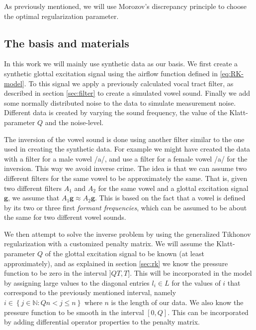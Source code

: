 \documentclass[12pt,a4]{article}
\newcommand{\N}{{\mathbb N}}
\newcommand{\vc}[1]{\ensuremath{\bm{#1}}}
\begin{document}
As previously mentioned, we will use Morozov's discrepancy principle to choose the optimal regularization parameter.

\subsection{The basis and materials}
\label{sec:basis}

In this work we will mainly use synthetic data as our basis. We first create a synthetic glottal excitation signal using the airflow function defined in \eqref{eq:RK-model}. To this signal we apply a previously calculated vocal tract filter, as described in section \ref{sec:filter} to create a simulated vowel sound. Finally we add some normally distributed noise to the data to simulate measurement noise. Different data is created by varying the sound frequency, the value of the Klatt-parameter $Q$ and the noise-level.

The inversion of the vowel sound is done using another filter similar to the one used in creating the synthetic data. For example we might have created the data with a filter for a male vowel /a/, and use a filter for a female vowel /a/ for the inversion. This way we avoid inverse crime. The idea is that we can assume two different filters for the same vowel to be approximately the same. That is, given two different filters $A_1$ and $A_2$ for the same vowel and a glottal excitation signal $\vc{g}$, we assume that $A_1 \vc{g} \approx A_2 \vc{g}$. This is based on the fact that a vowel is defined by its two or three first \emph{formant frequencies}, which can be assumed to be about the same for two different vowel sounds.\cite{digitalmodels}

We then attempt to solve the inverse problem by using the generalized Tikhonov regularization with a customized penalty matrix. We will assume the Klatt-parameter $Q$ of the glottal excitation signal to be known (at least approximately), and as explained in section \ref{sec:rk} we know the pressure function to be zero in the interval $]QT, T]$. This will be incorporated in the model by assigning large values to the diagonal entries $l_i \in L$ for the values of $i$ that correspond to the previously mentioned interval, namely $i \in \left\{ j \in \N : Qn < j \leq n \right\}$ where $n$ is the length of our data. We also know the pressure function to be smooth in the interval $[0, Q]$. This can be incorporated by adding differential operator properties to the penalty matrix.
\end{document}
